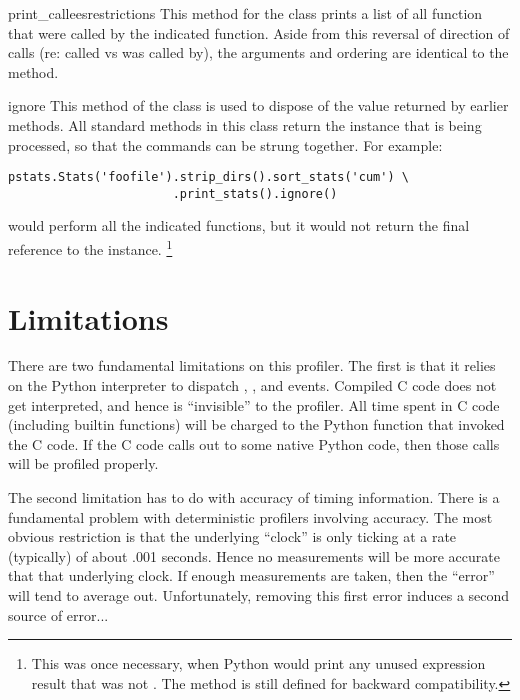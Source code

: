 \begin{funcdesc}{print_callees}{restrictions}
This method for the  class prints a list of all function
that were called by the indicated function.  Aside from this reversal
of direction of calls (re: called vs was called by), the arguments and
ordering are identical to the  method.
\end{funcdesc}

\begin{funcdesc}{ignore}{}
This method of the  class is used to dispose of the value
returned by earlier methods.  All standard methods in this class
return the instance that is being processed, so that the commands can
be strung together.  For example:

\begin{verbatim}
pstats.Stats('foofile').strip_dirs().sort_stats('cum') \
                       .print_stats().ignore()
\end{verbatim}

would perform all the indicated functions, but it would not return
the final reference to the \code{Stats} instance.%
\footnote{
This was once necessary, when Python would print any unused expression
result that was not \code{None}.  The method is still defined for
backward compatibility.
}
\end{funcdesc}


\section{Limitations}

There are two fundamental limitations on this profiler.  The first is
that it relies on the Python interpreter to dispatch \dfn{call},
\dfn{return}, and \dfn{exception} events.  Compiled C code does not
get interpreted, and hence is ``invisible'' to the profiler.  All time
spent in C code (including builtin functions) will be charged to the
Python function that invoked the C code.  If the C code calls out
to some native Python code, then those calls will be profiled
properly.

The second limitation has to do with accuracy of timing information.
There is a fundamental problem with deterministic profilers involving
accuracy.  The most obvious restriction is that the underlying ``clock''
is only ticking at a rate (typically) of about .001 seconds.  Hence no
measurements will be more accurate that that underlying clock.  If
enough measurements are taken, then the ``error'' will tend to average
out. Unfortunately, removing this first error induces a second source
of error...

